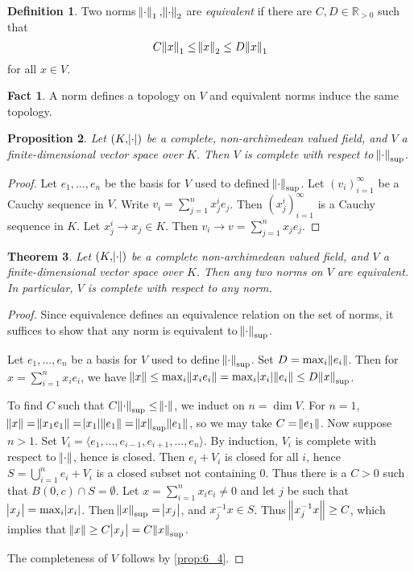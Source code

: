 \documentclass[11pt]{article}
\theoremstyle{definition}
\newtheorem{definition}{Definition}[subsection]
\newtheorem*{fact}{Fact}
\theoremstyle{plain}
\newtheorem{theorem}[definition]{Theorem}
\newtheorem{proposition}[definition]{Proposition}
\theoremstyle{remark}
\newcommand{\RR}{\mathbb{R}}
\begin{document}
\begin{definition}\label{def:6_3}
    Two norms $\norm{\cdot}_1, \norm{\cdot}_2$ are \emph{equivalent} if there are $C, D \in \RR_{>0}$ such that
    \begin{equation*}
        C \norm{x}_1 \le \norm{x}_2 \le D \norm{x}_1
    \end{equation*}
    for all $x \in V$.
\end{definition}
\begin{fact}
    A norm defines a topology on $V$ and equivalent norms induce the same topology.
\end{fact}

\begin{proposition}\label{prop:6_4}
    Let $(K, \abs{\cdot})$ be a complete, non-archimedean valued field, and $V$ a finite-dimensional vector space over $K$. Then $V$ is complete with respect to $\norm{\cdot}_\mathrm{sup}$.
\end{proposition}
\begin{proof}
    Let $e_1, \ldots, e_n$ be the basis for $V$ used to defined $\norm{\cdot}_\mathrm{sup}$. Let $(v_i)_{i=1}^\infty$ be a Cauchy sequence in $V$. Write $v_i = \sum_{j=1}^n x_j^i e_j$. Then $(x_j^i)_{i=1}^\infty$ is a Cauchy sequence in $K$. Let $x_j^i \to x_j \in K$. Then $v_i \to v = \sum_{j=1}^n x_j e_j$.
\end{proof}

\begin{theorem}\label{thm:6_5}
    Let $(K, \abs{\cdot})$ be a complete non-archimedean valued field, and $V$ a finite-dimensional vector space over $K$. Then any two norms on $V$ are equivalent. In particular, $V$ is complete with respect to any norm.
\end{theorem}
\begin{proof}
    Since equivalence defines an equivalence relation on the set of norms, it suffices to show that any norm is equivalent to $\norm{\cdot}_\mathrm{sup}$.

    Let $e_1, \ldots, e_n$ be a basis for $V$ used to define $\norm{\cdot}_\mathrm{sup}$. Set $D = \max_i \norm{e_i}$. Then for $x = \sum_{i=1}^n x_i e_i$, we have $\norm{x} \le \max_i \norm{x_i e_i} = \max_i \abs{x_i} \norm{e_i} \le D \norm{x}_\mathrm{sup}$.

    To find $C$ such that $C \norm{\cdot}_\mathrm{sup} \le \norm{\cdot}$, we induct on $n = \dim{V}$. For $n = 1$, $\norm{x} = \norm{x_1 e_1} = \abs{x_1}\norm{e_1} = \norm{x}_\mathrm{sup} \norm{e_1}$, so we may take $C = \norm{e_1}$. Now suppose $n > 1$. Set $V_i = \langle e_1, \ldots, e_{i-1}, e_{i+1}, \ldots, e_n \rangle$. By induction, $V_i$ is complete with respect to $\norm{\cdot}$, hence is closed. Then $e_i + V_i$ is closed for all $i$, hence $S = \bigcup_{i=1}^n e_i + V_i$ is a closed subset not containing $0$. Thus there is a $C > 0$ such that $B(0, c) \cap S = \emptyset$. Let $x = \sum_{i=1}^n x_i e_i \neq 0$ and let $j$ be such that $\abs{x_j} = \max_i \abs{x_i}$. Then $\norm{x}_\mathrm{sup} = \abs{x_j}$, and $x_j^{-1} x \in S$. Thus $\norm{x_j^{-1} x} \ge C$, which implies that $\norm{x} \ge C \abs{x_j} = C \norm{x}_\mathrm{sup}$.

    The completeness of $V$ follows by \autoref{prop:6_4}.
\end{proof}
\end{document}
